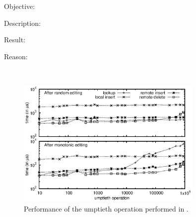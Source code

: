 \begin{asparadesc}
\item [Objective:]
\item [Description:]
\item [Result:]
\item [Reason:]
\end{asparadesc}

\ \\ 

\begin{figure}
  \centering
  \includegraphics[width=0.8\textwidth]{./img/bench.eps}
  \caption{\label{fig:bench} Performance of the umptieth operation performed in
    \LSEQ.}
\end{figure}

